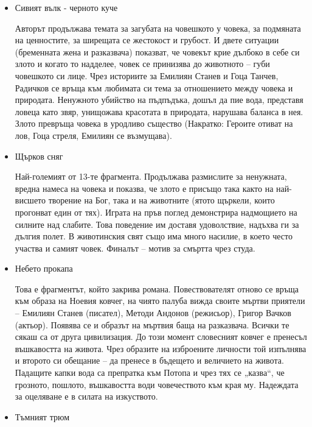 \documentclass[12pt,a4paper]{article}
\begin{document}
\begin{itemize}
    \hspace*{0.5cm} Авторът се връща назад в своите спомени, когато посещава с майка си гроба на баща си. Смъртта на бащата създава усещане, че майката и децата сякаш са изръсени от каруцата на живота и той е белязан само със скръб и самота. Светлината на фенера на гроба е искрицата надежда, че в живота има нещо по-добро, но често грубите му ръце загасят тази светлина. 
    \vspace{-0.2cm}
    \item Сивият вълк - черното куче
     
    \hspace*{0.5cm} Авторът продължава темата за загубата на човешкото у човека, за подмяната на ценностите, за ширещата се жестокост и грубост. И двете ситуации (бременната жена и разказвача) показват, че човекът крие дълбоко в себе си злото и когато то надделее, човек се принизява до животното – губи човешкото си лице. Чрез историите за Емилиян Станев и Гоца Танчев, Радичков се връща към любимата си тема за отношението между човека и природата. Ненужното убийство на пъдпъдъка, дошъл да пие вода, представя ловеца като звяр, унищожава красотата в природата, нарушава баланса в нея. Злото превръща човека в уродливо същество (Накратко: Героите отиват на лов, Гоца стреля, Емилиян се възмущава).
    \vspace{-0.2cm}
    \item Щърков сняг
     
    \hspace*{0.5cm} Най-големият от 13-те фрагмента. Продължава размислите за ненужната, вредна намеса на човека и показва, че злото е присъщо така както на най-висшето творение на Бог, така и на животните (ятото щъркели, които прогонват един от тях). Играта на пръв поглед демонстрира надмощието на силните над слабите. Това поведение им доставя удоволствие, надъхва ги за дългия полет. В животинския свят също има много насилие, в което често участва и самият човек. Финалът – мотив за смъртта чрез студа.
    \vspace{-0.2cm}
    \item Небето прокапа
     
    \hspace*{0.5cm} Това е фрагментът, който закрива романа. Повествователят отново се връща към образа на Ноевия ковчег, на чиято палуба вижда своите мъртви приятели – Емилиян Станев (писател), Методи Андонов (режисьор), Григор Вачков (актьор). Появява се и образът на мъртвия баща на разказвача. Всички те сякаш са от друга цивилизация. До този момент словесният ковчег е пренесъл въшкавостта на живота. Чрез образите на изброените личности той изпълнява и второто си обещание – да пренесе в бъдещето и величието на живота. Падащите капки вода са препратка към Потопа и чрез тях се „казва“, че грозното, пошлото, въшкавостта води човечеството към края му. Надеждата за оцеляване е в силата на изкуството.
    \vspace{-0.2cm}
    \item Тъмният трюм
     

\end{itemize}
\end{document}
